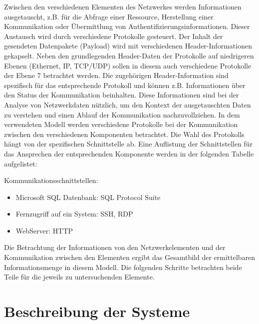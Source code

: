 Zwischen den verschiedenen Elementen des Netzwerkes werden Informationen ausgetauscht, z.B. für die Abfrage einer Ressource, Herstellung einer Kommunikation oder Übermittlung von Authentifizierungsinformationen. Dieser Austausch wird durch verschiedene Protokolle gesteuert. Der Inhalt der gesendeten Datenpakete (Payload) wird mit verschiedenen Header-Informationen gekapselt. Neben den grundlegenden Header-Daten der Protokolle auf niedrigeren Ebenen (Ethernet, IP, TCP/UDP) sollen in diesem auch verschiedene Protokolle der Ebene 7 betrachtet werden. Die zugehörigen Header-Information sind spezifisch für das entsprechende Protokoll und können z.B. Informationen über den Status der Kommunikation beinhalten. Diese Informationen sind bei der Analyse von Netzwerkdaten nützlich, um den Kontext der ausgetauschten Daten zu verstehen und einen Ablauf der Kommunikation nachzuvollziehen.
In dem verwendeten Modell werden verschiedene Protokolle bei der Kommunikation zwischen den verschiedenen Komponenten betrachtet. Die Wahl des Protokolls hängt von der spezifischen Schnittstelle ab. Eine Auflistung der Schnittstellen für das Ansprechen der entsprechenden Komponente werden in der folgenden Tabelle aufgelistet:

Kommunikationsschnittstellen:
\begin{itemize}
\item Microsoft SQL Datenbank: SQL Protocol Suite
\item Fernzugriff auf ein System: SSH, RDP
\item WebServer: HTTP
\end{itemize}

Die Betrachtung der Informationen von den Netzwerkelementen und der Kommunikation zwischen den Elementen ergibt das Gesamtbild der ermittelbaren Informationsmenge in diesem Modell. Die folgenden Schritte betrachten beide Teile für die jeweils zu untersuchenden Elemente.

\section{Beschreibung der Systeme}
